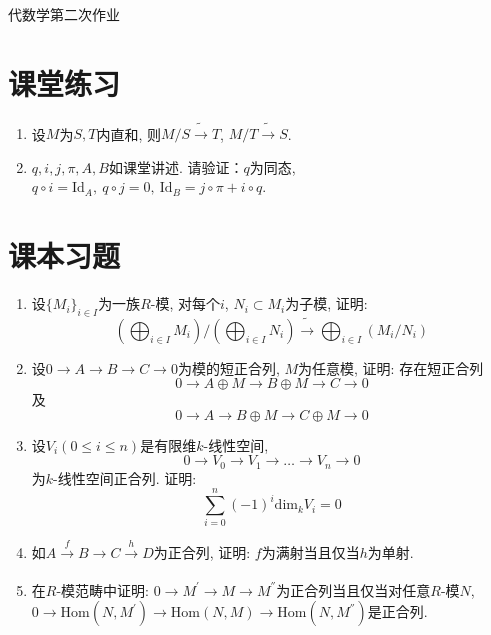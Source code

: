 \documentclass[12pt]{article}
\begin{document}
\begin{center}
            \large{代数学第二次作业}
\end{center}
\section{课堂练习}
\begin{enumerate}
    \item 设$M$为$S,T$内直和, 则$M/S\tilde{\rightarrow}T$, $M/T\tilde{\rightarrow}S$.
    \item $q,i,j,\pi,A,B$如课堂讲述. 请验证：$q$为同态, $q\circ i=\mathrm{Id}_A,\ q\circ j=0,\ \mathrm{Id}_B=j\circ\pi+i\circ q$.
\end{enumerate}
\section{课本习题}
\begin{enumerate}
    \item 设$\{M_i\}_{i\in I}$为一族$R$-模, 对每个$i$, $N_i\subset M_i$为子模, 证明:$$(\bigoplus_{i\in I}M_i)/(\bigoplus_{i\in I}N_i)\tilde{\rightarrow}\bigoplus_{i\in I}(M_i/N_i)$$
    \item 设$0\rightarrow A\rightarrow B\rightarrow C \rightarrow 0$为模的短正合列, $M$为任意模, 证明: 存在短正合列$$0\rightarrow A\oplus M\rightarrow B\oplus M\rightarrow C \rightarrow 0$$及$$0\rightarrow A\rightarrow B\oplus M\rightarrow C\oplus M \rightarrow 0$$
    \item 设$V_i(0\leq i\leq n)$是有限维$k$-线性空间, $$0\rightarrow V_0\rightarrow V_1\rightarrow \dots \rightarrow V_n \rightarrow 0$$为$k$-线性空间正合列. 证明:$$\sum_{i=0}^n (-1)^i \mathrm{dim}_k V_i=0$$
    \item 如$A\xrightarrow{f}B\xrightarrow[]{}C\xrightarrow{h}D$为正合列, 证明: $f$为满射当且仅当$h$为单射.
    \item 在$R$-模范畴中证明: $0\rightarrow M^{'}\rightarrow M \rightarrow M^{''}$为正合列当且仅当对任意$R$-模$N$, $0\rightarrow \mathrm{Hom}(N,M^{'})\rightarrow \mathrm{Hom}(N,M) \rightarrow \mathrm{Hom}(N,M^{''})$是正合列.
    \end{enumerate}
  
\end{document}
